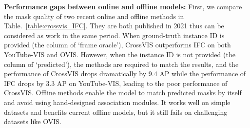 \documentclass[runningheads]{llncs}
\begin{document}
\noindent\textbf{Performance gaps between online and offline models: }
First, we compare the mask quality of two recent online and offline methods in Table.~\ref{table:crossvis_IFC}. 
They are both published in 2021 thus can be considered as work in the same period.
When ground-truth instance ID is provided (the column of `frame oracle'), CrossVIS outperforms IFC on both YouTube-VIS and OVIS. However, when the instance ID is not provided (the column of `predicted'), the methods are required to match the results, and the performance of CrossVIS drops dramatically by 9.4 AP while the performance of IFC drops by 3.3 AP on YouTube-VIS, leading to the poor performance of CrossVIS. Offline methods enable the model to match predicted masks by itself and avoid using hand-designed association modules. It works well on simple datasets and benefits current offline models, but it still fails on 
challenging datasets like OVIS. 



\setlength{\tabcolsep}{4pt}
\begin{table}[t]
\begin{center}
\caption{Oracle experiments on association quality. Frame oracle means gt instance ID is provided (same to Fig.~\ref{fig:motivation}). We set the clip length of IFC to 10. AP is reported.}
\label{table:crossvis_IFC}
\end{center}
\vspace{-2em}
\end{table}
\setlength{\tabcolsep}{1.4pt}
\end{document}
